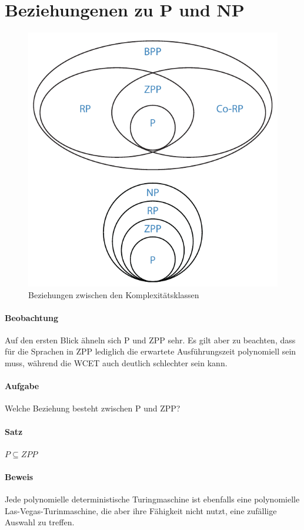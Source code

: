 \section{Beziehungenen zu P und NP}
\begin{figure}[h]
	\centering
	\includegraphics[width=.8\textwidth]{Graphics/Relationships}
	\caption{Beziehungen zwischen den Komplexitätsklassen}
	\label{fig:cc_relationships}
\end{figure}
\paragraph{Beobachtung}
Auf den ersten Blick ähneln sich P und ZPP sehr.
Es gilt aber zu beachten, dass für die Sprachen in ZPP lediglich die erwartete Ausführungszeit polynomiell sein muss, während die WCET auch deutlich schlechter sein kann.

\paragraph{Aufgabe}
Welche Beziehung besteht zwischen P und ZPP?

\paragraph{Satz}
$P \subseteq ZPP$

\paragraph{Beweis}
Jede polynomielle deterministische Turingmaschine ist ebenfalls eine polynomielle Las-Vegas-Turinmaschine, die aber ihre Fähigkeit nicht nutzt, eine zufällige Auswahl zu treffen.

